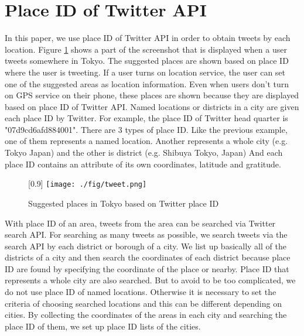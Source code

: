 \documentclass[twocolumn]{article}
\begin{document}
\vspace{-6mm}

\section{Place ID of Twitter API}\label{sec:placeid}
\vspace{-2mm}
In this paper, we use place ID of Twitter API \cite{twitter_api_placeid} in order to obtain tweets by each location. 
Figure \ref{fig:tweet} shows a part of the screenshot that is displayed when a user tweets somewhere in Tokyo.
The suggested places are shown based on place ID where the user is tweeting.
If a user turns on location service, the user can set one of the suggested areas as location information. 
Even when users don't turn on GPS service on their phone, these places are shown because they are displayed based on place ID of Twitter API.
Named locations or districts in a city are given each place ID by Twitter.
For example, the place ID of Twitter head quarter is "07d9cd6afd884001".
There are 3 types of place ID.
Like the previous example, one of them represents a named location.
Another represents a whole city (e.g. Tokyo Japan) and the other is district (e.g. Shibuya Tokyo, Japan)
And each place ID contains an attribute of its own coordinates, latitude and gratitude.

\begin{figure}
	\centering
	\scalebox{0.8}[0.9]{
	\texttt{[image: ./fig/tweet.png]}
	}
	\caption{Suggested places in Tokyo based on Twitter place ID}
	\label{fig:tweet}
\end{figure}

With place ID of an area, tweets from the area can be searched via Twitter search API.
For searching as many tweets as possible, we search tweets via the search API by each district or borough of a city.
We list up basically all of the districts of a city and then search the coordinates of each district because place ID are found by specifying the coordinate of the place or nearby.
Place ID that represents a whole city are also searched.
But to avoid to be too complicated, we do not use place ID of named locations.
Otherwise it is necessary to set the criteria of choosing searched locations and this can be different depending on cities.
By collecting the coordinates of the areas in each city and searching the place ID of them, we set up place ID lists of the cities.
\end{document}
